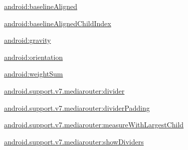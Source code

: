 {\ttfamily \hyperlink{classandroid_1_1support_1_1v7_1_1mediarouter_1_1R_1_1styleable_ae32c36f372f932bad44d2481a642da4c}{android\+:baseline\+Aligned}}

{\ttfamily \hyperlink{classandroid_1_1support_1_1v7_1_1mediarouter_1_1R_1_1styleable_ad40362c472388ae048a0f344c697bdc6}{android\+:baseline\+Aligned\+Child\+Index}}

{\ttfamily \hyperlink{classandroid_1_1support_1_1v7_1_1mediarouter_1_1R_1_1styleable_a692f390f8126d586f90715ad68d334e4}{android\+:gravity}}

{\ttfamily \hyperlink{classandroid_1_1support_1_1v7_1_1mediarouter_1_1R_1_1styleable_ada8e9e4cc920ef1d55ef1492d8ef474a}{android\+:orientation}}

{\ttfamily \hyperlink{classandroid_1_1support_1_1v7_1_1mediarouter_1_1R_1_1styleable_a65beefd6258229dc07bd6ee75c3895a1}{android\+:weight\+Sum}}

{\ttfamily \hyperlink{classandroid_1_1support_1_1v7_1_1mediarouter_1_1R_1_1styleable_a971e3c277de0c3db5814dd8f86ca0eb6}{android.\+support.\+v7.\+mediarouter\+:divider}}

{\ttfamily \hyperlink{classandroid_1_1support_1_1v7_1_1mediarouter_1_1R_1_1styleable_a6f1edd962e5544040cdb17a48e26029a}{android.\+support.\+v7.\+mediarouter\+:divider\+Padding}}

{\ttfamily \hyperlink{classandroid_1_1support_1_1v7_1_1mediarouter_1_1R_1_1styleable_aa6040492a9158589fe5eb2883eac10e6}{android.\+support.\+v7.\+mediarouter\+:measure\+With\+Largest\+Child}}

{\ttfamily \hyperlink{classandroid_1_1support_1_1v7_1_1mediarouter_1_1R_1_1styleable_a54ae018341bb332d05e8be7723f49be8}{android.\+support.\+v7.\+mediarouter\+:show\+Dividers}}

